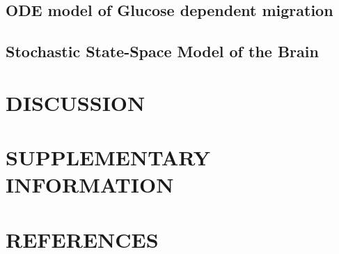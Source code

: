 \documentclass[times,twoside]{zHenriquesLab-StyleBioRxiv}
\begin{document}
\subsection{ODE model of Glucose dependent migration} 

\subsection{Stochastic State-Space Model of the Brain} 

\section*{DISCUSSION}

\section*{SUPPLEMENTARY INFORMATION}

\section*{REFERENCES}



\end{document}
